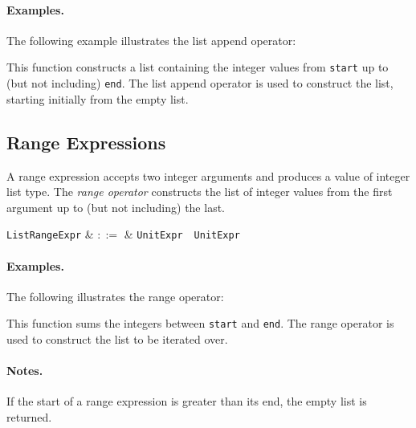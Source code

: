 \paragraph{Examples.} The following example illustrates the list append operator:



This function constructs a list containing the integer values from \lstinline{start} up to (but not including) \lstinline{end}.  The list append operator is used to construct the list, starting initially from the empty list.


\subsection{Range Expressions}
\label{c_expr_range}

A range expression accepts two integer arguments and produces a value of integer list type.  The {\em range operator} constructs the list of integer values from the first argument up to (but not including) the last.

\begin{syntax}
  \verb+ListRangeExpr+ & $::=$ & \verb+UnitExpr+\ \ \verb+UnitExpr+\\
\end{syntax}

\paragraph{Examples.}  The following illustrates the range operator:



This function sums the integers between \lstinline{start} and \lstinline{end}.  The range operator is used to construct the list to be iterated over.

\paragraph{Notes.}  If the start of a range expression is greater than its end, the empty list is returned.


